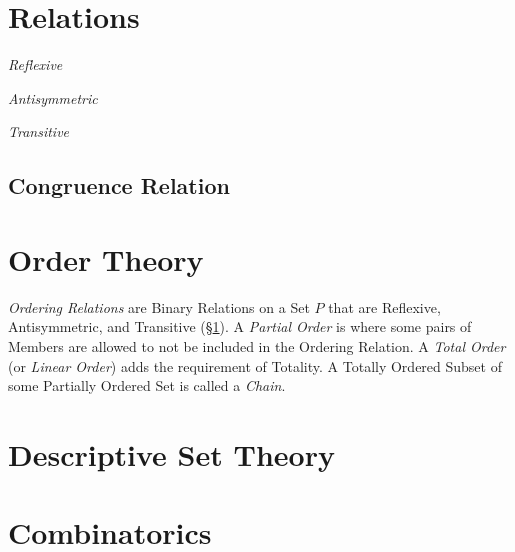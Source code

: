 \documentclass{article}
\begin{document}
\section{Relations}\label{sec:set_relations}

\emph{Reflexive}

\emph{Antisymmetric}

\emph{Transitive}

\subsection{Congruence Relation}\label{subsec:congruence_relation}

\section{Order Theory}\label{sec:order_theory}

\emph{Ordering Relations} are Binary Relations on a Set $P$ that are
Reflexive, Antisymmetric, and Transitive (\S\ref{sec:set_relations}).
A \emph{Partial Order} is where some pairs of Members are allowed to
not be included in the Ordering Relation. A \emph{Total Order} (or
\emph{Linear Order}) adds the requirement of Totality. A Totally
Ordered Subset of some Partially Ordered Set is called a \emph{Chain}.


\section{Descriptive Set Theory}

\section{Combinatorics}

\end{document}
